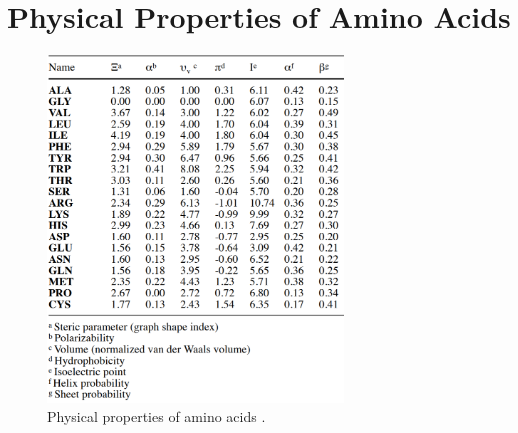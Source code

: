 \chapter{Physical Properties of Amino Acids}
\label{app:PPAA}


\begin{figure}[ht]
	\begin{center}
		\includegraphics[width=0.7\textwidth]{tex/append/PPamino}
	\end{center}
	\caption[Physical properties of amino acids.]{Physical properties of amino acids \cite{Meiler.2001}.}
	\label{fig:appendSSstruct}
\end{figure} 